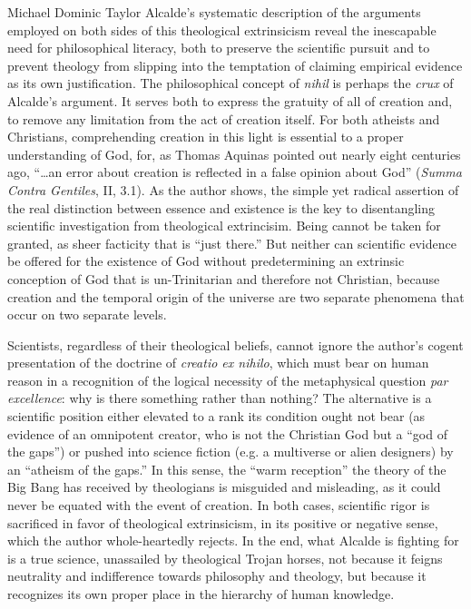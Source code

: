 \begin{recengenv}{Michael Dominic Taylor}
Alcalde's systematic description of the arguments employed on both sides of this theological extrinsicism reveal the inescapable need for philosophical literacy, both to preserve the scientific pursuit and to prevent theology from slipping into the temptation of claiming empirical evidence as its own justification. The philosophical concept of \textit{nihil} is perhaps the \textit{crux} of Alcalde's argument. It serves both to express the gratuity of all of creation and, to remove any limitation from the act of creation itself. For both atheists and Christians, comprehending creation in this light is essential to a proper understanding of God, for, as Thomas Aquinas pointed out nearly eight centuries ago, ``…an error about creation is reflected in a false opinion about God'' (\textit{Summa Contra Gentiles}, II, 3.1). As the author shows, the simple yet radical assertion of the real distinction between essence and existence is the key to disentangling scientific investigation from theological extrincisim. Being cannot be taken for granted, as sheer facticity that is ``just there.'' But neither can scientific evidence be offered for the existence of God without predetermining an extrinsic conception of God that is un-Trinitarian and therefore not Christian, because creation and the temporal origin of the universe are two separate phenomena that occur on two separate levels.

Scientists, regardless of their theological beliefs, cannot ignore the author's cogent presentation of the doctrine of \textit{creatio ex nihilo}, which must bear on human reason in a recognition of the logical necessity of the metaphysical question \textit{par excellence}: why is there something rather than nothing? The alternative is a scientific position either elevated to a rank its condition ought not bear (as evidence of an omnipotent creator, who is not the Christian God but a ``god of the gaps'') or pushed into science fiction (e.g. a multiverse or alien designers) by an ``atheism of the gaps.'' In this sense, the ``warm reception'' the theory of the Big Bang has received by theologians is misguided and misleading, as it could never be equated with the event of creation. In both cases, scientific rigor is sacrificed in favor of theological extrinsicism, in its positive or negative sense, which the author whole-heartedly rejects. In the end, what Alcalde is fighting for is a true science, unassailed by theological Trojan horses, not because it feigns neutrality and indifference towards philosophy and theology, but because it recognizes its own proper place in the hierarchy of human knowledge.




\end{recengenv}